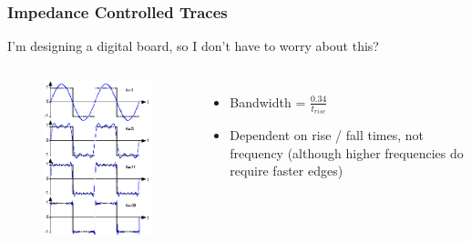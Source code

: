 \documentclass[t]{beamer}
\begin{document}
\begin{frame}
\frametitle{Impedance Controlled Traces}
I'm designing a digital board, so I don't have to worry about this?\\
\begin{columns}
	\begin{figure}
		\includegraphics[width=0.7\linewidth]{squareFFT.png}
	\end{figure}

	\begin{itemize}
		\item Bandwidth = $\frac{0.34}{t_{rise}}$
		\item Dependent on rise / fall times, not frequency (although higher frequencies do require faster edges)
	\end{itemize}
\end{columns}
\end{frame}
\end{document}
